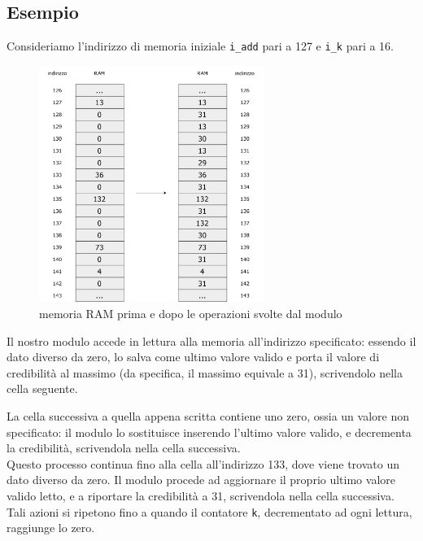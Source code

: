 \documentclass{article}
\begin{document}
\vspace{0.5cm}
\subsection{Esempio}
Consideriamo l'indirizzo di memoria iniziale \texttt{i\_add} pari a 127 e \texttt{i\_k} pari a 16.

\begin{figure}[h]
    \centering
    \includegraphics[width=0.65\textwidth]{images/example.png}
    \caption[short]{memoria RAM prima e dopo le operazioni svolte dal modulo}
\end{figure}

\bigskip
Il nostro modulo accede in lettura alla memoria all'indirizzo specificato: essendo il dato diverso da zero, lo salva come ultimo valore valido e porta il valore di credibilità al massimo (da specifica, il massimo equivale a 31), scrivendolo nella cella seguente.

\newpage
La cella successiva a quella appena scritta contiene uno zero, ossia un valore non specificato: il modulo lo sostituisce inserendo l'ultimo valore valido, e decrementa la credibilità, scrivendola nella cella successiva. 
\bigskip \\ Questo processo continua fino alla cella all'indirizzo 133, dove viene trovato un dato diverso da zero. Il modulo procede ad aggiornare il proprio ultimo valore valido letto, e a riportare la credibilità a 31, scrivendola nella cella successiva.
\bigskip \\ Tali azioni si ripetono fino a quando il contatore \texttt{k}, decrementato ad ogni lettura, raggiunge lo zero.
\end{document}
